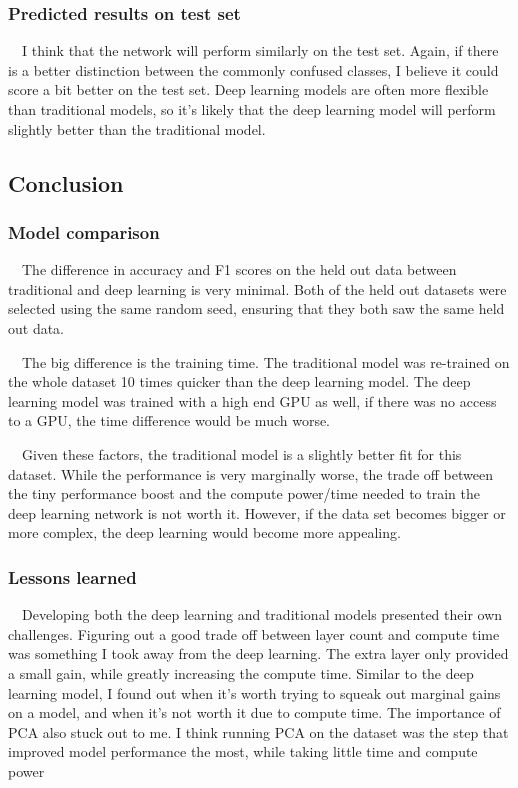 \documentclass[12pt]{article}
\begin{document}
\subsubsection{Predicted results on test set}

\ \ I think that the network will perform similarly on the test set. Again, if there is a better distinction between the commonly confused classes, I believe it could score a bit better on the test set. Deep learning models are often more flexible than traditional models, so it's likely that the deep learning model will perform slightly better than the traditional model.


\subsection{Conclusion}

\subsubsection{Model comparison}

\ \ The difference in accuracy and F1 scores on the held out data between traditional and deep learning is very minimal. Both of the held out datasets were selected using the same random seed, ensuring that they both saw the same held out data. 

\ \ The big difference is the training time. The traditional model was re-trained on the whole dataset 10 times quicker than the deep learning model. The deep learning model was trained with a high end GPU as well, if there was no access to a GPU, the time difference would be much worse. 

\ \ Given these factors, the traditional model is a slightly better fit for this dataset. While the performance is very marginally worse, the trade off between the tiny performance boost and the compute power/time needed to train the deep learning network is not worth it. However, if the data set becomes bigger or more complex, the deep learning would become more appealing. 

\subsubsection{Lessons learned}

\ \ Developing both the deep learning and traditional models presented their own challenges. Figuring out a good trade off between layer count and compute time was something I took away from the deep learning. The extra layer only provided a small gain, while greatly increasing the compute time. Similar to the deep learning model, I found out when it's worth trying to squeak out marginal gains on a model, and when it's not worth it due to compute time. The importance of PCA also stuck out to me. I think running PCA on the dataset was the step that improved model performance the most, while taking little time and compute power
\end{document}
